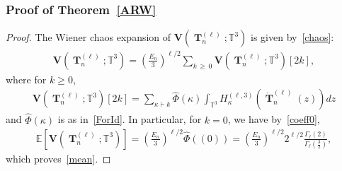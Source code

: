 \documentclass[10pt]{amsart}
\theoremstyle{definition}\newtheorem{defi}[theo]{Definition}\newtheorem{rema}[theo]{Remark}\newtheorem{exam}[theo]{Example}\newtheorem{exem}[theo]{Example}\newtheorem{nota}[theo]{Notation}
\DeclareMathOperator{\bT}{\mathbf{T}}
\newcommand{\bfv}{\mathbf{V}}
\newcommand{\T}{\mathbb{T}^3}
\newcommand{\E}[1]{\mathbb{E}\left[#1\right]}
\begin{document}
\subsubsection*{Proof of Theorem~\ref{ARW}}
\begin{proof}
The Wiener chaos expansion of $\bfv(\bT_n^{(\ell)};\T)$ is given by~\eqref{chaos}:
\begin{gather}\label{chaosARW}
\bfv(\bT_n^{(\ell)};\T) = \left(\frac{E_n}{3}\right)^{\ell/2}\sum_{k \,\geq\,0} \bfv\left(\bT_n^{(\ell)};\T\right)[2k],
\end{gather}
where for $k\geq0$,
\begin{gather*}
\bfv\left(\bT_n^{(\ell)};\T\right)[2k] = \sum_{\kappa \vdash k} \widehat{\Phi}(\kappa) \int_{\T} H_{\kappa}^{(\ell,3)}\left(\dot{\bT}_n^{(\ell)}(z)\right) dz
\end{gather*}
and $\widehat{\Phi}(\kappa)$ is as in~\eqref{ForId}. In particular, for $k=0$, we have by~\eqref{coeff0},
\begin{gather*}
\E{\bfv\left(\bT_n^{(\ell)};\T\right)} =
\left(\frac{E_n}{3}\right)^{\ell/2} \widehat{\Phi}((0)) =
\left(\frac{E_n}{3}\right)^{\ell/2} 2^{\ell/2}\frac{\Gamma_{\ell}(2)}{\Gamma_{\ell}\left(\frac{3}{2}\right)},
\end{gather*}
which proves~\eqref{mean}.



\end{proof}
\end{document}
